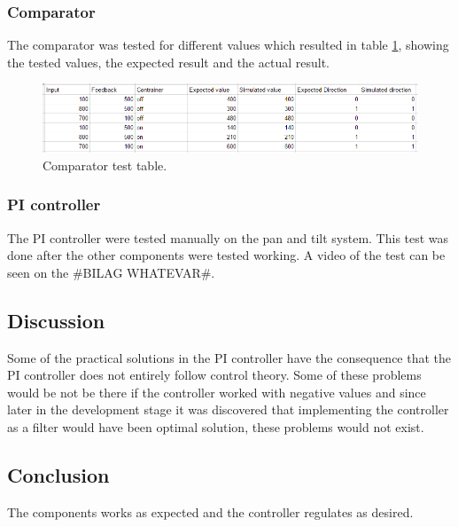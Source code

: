 \subsubsection{Comparator}

The comparator was tested for different values which resulted in table \ref{fig:Comparator_test_table}, showing the tested values, the expected result and the actual result.


\begin{figure}[h!]
\centering
\includegraphics[scale=0.7]{Billeder/FPGA/Comparator_test_table.png}
\caption{Comparator test table.}
\label{fig:Comparator_test_table}
\end{figure}


\subsubsection{PI controller}

The PI controller were tested manually on the pan and tilt system. This test was done after the other components were tested working. A video of the test can be seen on the \#BILAG WHATEVAR\#.


\subsection{Discussion}

Some of the practical solutions in the PI controller have the consequence that the PI controller does not entirely follow control theory. Some of these problems would be not be there if the controller worked with negative values and since later in the development stage it was discovered that implementing the controller as a filter would have been optimal solution, these problems would not exist.


\subsection{Conclusion}

The components works as expected and the controller regulates as desired.











